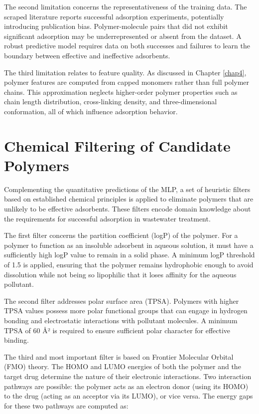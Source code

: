 The second limitation concerns the representativeness of the training data. The scraped literature reports successful adsorption experiments, potentially introducing publication bias. Polymer-molecule pairs that did not exhibit significant adsorption may be underrepresented or absent from the dataset. A robust predictive model requires data on both successes and failures to learn the boundary between effective and ineffective adsorbents.

The third limitation relates to feature quality. As discussed in Chapter \ref{chap4}, polymer features are computed from capped monomers rather than full polymer chains. This approximation neglects higher-order polymer properties such as chain length distribution, cross-linking density, and three-dimensional conformation, all of which influence adsorption behavior.

\section{Chemical Filtering of Candidate Polymers}
\label{sec:filtering_section}

Complementing the quantitative predictions of the MLP, a set of heuristic filters based on established chemical principles is applied to eliminate polymers that are unlikely to be effective adsorbents. These filters encode domain knowledge about the requirements for successful adsorption in wastewater treatment.

The first filter concerns the partition coefficient (logP) of the polymer. For a polymer to function as an insoluble adsorbent in aqueous solution, it must have a sufficiently high logP value to remain in a solid phase. A minimum logP threshold of 1.5 is applied, ensuring that the polymer remains hydrophobic enough to avoid dissolution while not being so lipophilic that it loses affinity for the aqueous pollutant.

The second filter addresses polar surface area (TPSA). Polymers with higher TPSA values possess more polar functional groups that can engage in hydrogen bonding and electrostatic interactions with pollutant molecules. A minimum TPSA of 60 \r{A}² is required to ensure sufficient polar character for effective binding.

The third and most important filter is based on Frontier Molecular Orbital (FMO) theory. The HOMO and LUMO energies of both the polymer and the target drug determine the nature of their electronic interactions. Two interaction pathways are possible: the polymer acts as an electron donor (using its HOMO) to the drug (acting as an acceptor via its LUMO), or vice versa. The energy gaps for these two pathways are computed as:

